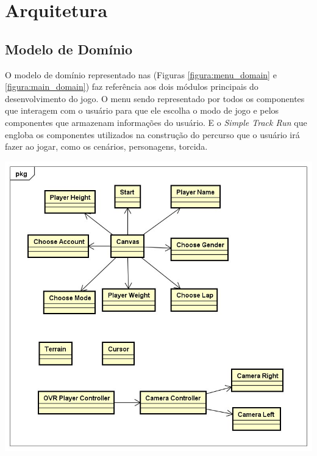 \section{Arquitetura}

\subsection{Modelo de Domínio}

O modelo de domínio representado nas (Figuras \ref{figura:menu_domain} e \ref{figura:main_domain}) faz referência aos dois módulos principais do desenvolvimento do jogo. O menu sendo representado por todos os componentes que interagem com o usuário para que ele escolha o modo de jogo e pelos componentes que armazenam informações do usuário. E o \textit{Simple Track Run} que engloba os componentes utilizados na construção do percurso que o usuário irá fazer ao jogar, como os cenários, personagens, torcida.

\begin{center}
	\includegraphics[scale=0.5]{figuras/menu_domain}
	\label{figura:menu_domain}
\end{center}

